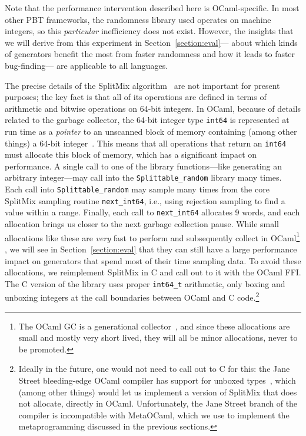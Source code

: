 \documentclass[acmsmall]{acmart}
\theoremstyle{definition}
\begin{document}
Note that the performance intervention described here is OCaml-specific.
In most other PBT frameworks, the randomness library used operates on machine
integers, so this \emph{particular} inefficiency does not exist.
However, the insights that we will derive from this experiment in Section~\ref{section:eval}---
about which kinds of generators benefit the most from faster randomness and how it leads to faster bug-finding---
are applicable to all languages.

The precise details of the SplitMix algorithm~\cite{splitmix} are not important for
present purposes; the key fact is that all of its operations are
defined in terms of arithmetic and bitwise operations on 64-bit integers. In OCaml,
because of details related to the garbage collector, the 64-bit integer type \texttt{int64} is represented
at run time as a \emph{pointer} to an unscanned block of memory containing (among other things)
a 64-bit integer~\cite{realworldocaml}. This means that all operations that return an \texttt{int64} must allocate this block of memory,
which has a significant impact on performance. A single call to
one of the \bq library functions---like generating an arbitrary integer---may call into the \texttt{Splittable\_random}
library many times. Each call into \texttt{Splittable\_random}
may sample many times from the core SplitMix sampling routine \texttt{next\_int64}, i.e., using rejection sampling to find a value within a range.
Finally, each call to \texttt{next\_int64} allocates 9 words, and each allocation brings us closer
to the next garbage collection pause. While small allocations like these are \emph{very} fast to perform and subsequently
collect in OCaml\footnote{The OCaml GC is a generational collector~\cite{realworldocaml}, and since these allocations are small and mostly very short lived, they will all be minor allocations, never to be promoted.}
, we will see in Section~\ref{section:eval} that they can still have
a large performance impact on generators that spend most of their time sampling data.
To avoid these allocations, we
reimplement SplitMix in C and call out to it with the OCaml FFI. The C version of the library uses
proper \texttt{int64\_t} arithmetic, only boxing and unboxing integers at the call boundaries between OCaml and
C code.\footnote{Ideally in the future, one would not need to call out to C for this: the Jane Street bleeding-edge OCaml compiler has support
for unboxed types~\cite{unboxedtypes}, which (among other things) would let us implement a version of SplitMix that does not allocate, directly
in OCaml. Unfortunately, the Jane Street branch of the compiler is incompatible with MetaOCaml, which we use to implement the metaprogramming
discussed in the previous sections.}
\end{document}
